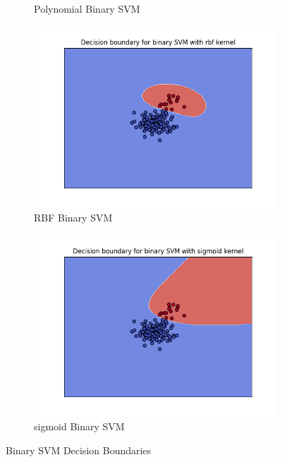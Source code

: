 \documentclass[12pt]{article}
\begin{document}
\begin{figure}
\begin{subfigure}{0.45\textwidth}
        \caption{Polynomial Binary SVM}
    \end{subfigure}
    \begin{subfigure}{0.45\textwidth}
        \centering
        \includegraphics[width=\textwidth]{plots/rbf_binary.png}
        \caption{RBF Binary SVM}
    \end{subfigure}
    \begin{subfigure}{0.45\textwidth}
        \centering
        \includegraphics[width=\textwidth]{plots/sigmoid_binary.png}
        \caption{sigmoid Binary SVM}
    \end{subfigure}
    \caption{Binary SVM Decision Boundaries}
\end{figure}
\end{document}
